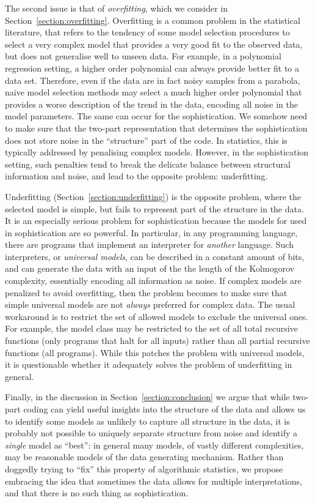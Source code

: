 \documentclass{style/llncs}
\begin{document}
The second issue is that of \emph{overfitting}, which we consider in Section~\ref{section:overfitting}. Overfitting is a common problem in the statistical literature, that refers to the tendency of some model selection procedures to select a very complex model that provides a very good fit to the observed data, but does not generalise well to unseen data. For example, in a polynomial regression setting, a higher order polynomial can always provide better fit to a data set. Therefore, even if the data are in fact noisy samples from a parabola, naive model selection methods may select a much higher order polynomial that provides a worse description of the trend in the data, encoding all noise in the model parameters. The same can occur for the sophistication. We somehow need to make sure that the two-part representation that determines the sophistication does not store noise in the ``structure'' part of the code. In statistics, this is typically addressed by penalising complex models. However, in the sophistication setting, such penalties tend to break the delicate balance between structural information and noise, and lead to the opposite problem: underfitting.

Underfitting (Section~\ref{section:underfitting}) is the opposite problem, where the selected model is simple, but fails to represent part of the structure in the data. It is an especially serious problem for sophistication because the models for used in sophistication are so powerful. In particular, in any programming language, there are programs that implement an interpreter for \emph{another} language. Such interpreters, or \emph{universal models}, can be described in a constant amount of bits, and can generate the data with an input of the  the length of the Kolmogorov complexity, essentially encoding all information as noise. If complex models are penalized to avoid overfitting, then the problem becomes to make sure that simple universal models are not \emph{always} preferred for complex data. The usual workaround is to restrict the set of allowed models to exclude the universal ones. For example, the model class may be restricted to the set of all total recursive functions (only programs that halt for all inputs) rather than all partial recursive functions (all programs). While this patches the problem with universal models, it is questionable whether it adequately solves the problem of underfitting in general.

Finally, in the discussion in Section~\ref{section:conclusion} we argue that while two-part coding can yield useful insights into the structure of the data and allows us to identify some models as unlikely to capture all structure in the data, it is probably not possible to uniquely separate structure from noise and identify a \emph{single} model as ``best'': in general many models, of vastly different complexities, may be reasonable models of the data generating mechanism. Rather than doggedly trying to ``fix'' this property of algorithmic statistics, we propose embracing the idea that sometimes the data allows for multiple interpretations, and that there is no such thing as sophistication.
\end{document}
